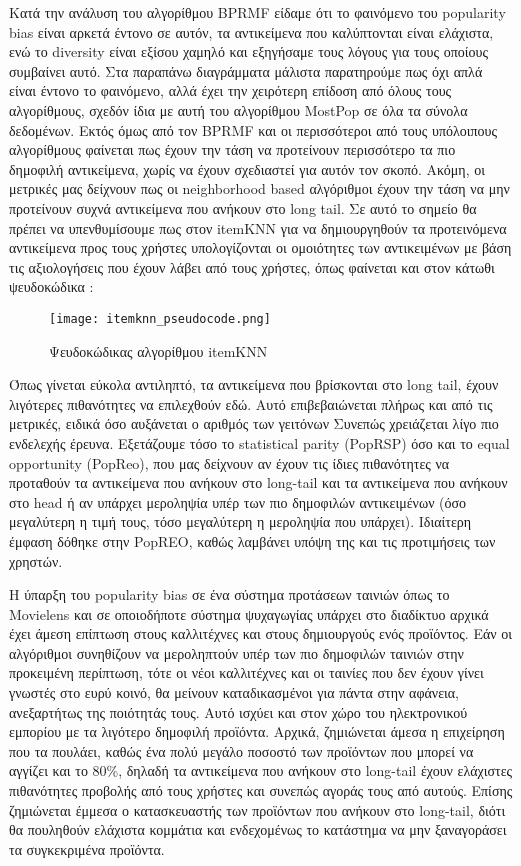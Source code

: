 \noindent Κατά την ανάλυση του αλγορίθμου BPRMF είδαμε ότι το φαινόμενο του popularity bias είναι αρκετά έντονο σε αυτόν, τα αντικείμενα που καλύπτονται είναι ελάχιστα, ενώ το diversity είναι εξίσου χαμηλό και εξηγήσαμε τους λόγους για τους οποίους συμβαίνει αυτό. Στα παραπάνω διαγράμματα μάλιστα παρατηρούμε πως όχι απλά είναι έντονο το φαινόμενο, αλλά έχει την χειρότερη επίδοση από όλους τους αλγορίθμους, σχεδόν ίδια με αυτή του αλγορίθμου MostPop σε όλα τα σύνολα δεδομένων. Εκτός όμως από τον BPRMF και οι περισσότεροι από τους υπόλοιπους αλγορίθμους φαίνεται πως έχουν την τάση να προτείνουν περισσότερο τα πιο δημοφιλή αντικείμενα, χωρίς να έχουν σχεδιαστεί για αυτόν τον σκοπό. Ακόμη, οι μετρικές μας δείχνουν πως οι neighborhood based αλγόριθμοι έχουν την τάση να μην προτείνουν συχνά αντικείμενα που ανήκουν στο long tail. Σε αυτό το σημείο θα πρέπει να υπενθυμίσουμε πως στον itemKNN για να δημιουργηθούν τα προτεινόμενα αντικείμενα προς τους χρήστες υπολογίζονται οι ομοιότητες των αντικειμένων με βάση τις αξιολογήσεις που έχουν λάβει από τους χρήστες, όπως φαίνεται και στον κάτωθι ψευδοκώδικα \cite{lindenAmazonComRecommendations2003}:
\begin{figure}[H]
	\centering
	\texttt{[image: itemknn\_pseudocode.png]}
	\caption{Ψευδοκώδικας αλγορίθμου itemKNN}
	\label{fig:item_pseudo}
\end{figure}
\noindent Όπως γίνεται εύκολα αντιληπτό, τα αντικείμενα που βρίσκονται στο long tail, έχουν λιγότερες πιθανότητες να επιλεχθούν εδώ. Αυτό επιβεβαιώνεται πλήρως και από τις μετρικές, ειδικά όσο αυξάνεται ο αριθμός των γειτόνων
Συνεπώς χρειάζεται λίγο πιο ενδελεχής έρευνα.
Εξετάζουμε τόσο το statistical parity (PopRSP) όσο και το equal opportunity (PopReo), που μας δείχνουν αν έχουν τις ίδιες πιθανότητες να προταθούν τα αντικείμενα που ανήκουν στο long-tail και τα αντικείμενα που ανήκουν στο head ή αν υπάρχει μεροληψία υπέρ των πιο δημοφιλών αντικειμένων (όσο μεγαλύτερη η τιμή τους, τόσο μεγαλύτερη η μεροληψία που υπάρχει). Ιδιαίτερη έμφαση δόθηκε στην PopREO, καθώς λαμβάνει υπόψη της και τις προτιμήσεις των χρηστών.

\noindent Η ύπαρξη του popularity bias σε ένα σύστημα προτάσεων ταινιών όπως το Movielens και σε οποιοδήποτε σύστημα ψυχαγωγίας υπάρχει στο διαδίκτυο αρχικά έχει άμεση επίπτωση στους καλλιτέχνες και στους δημιουργούς ενός προϊόντος. Εάν οι αλγόριθμοι συνηθίζουν να μεροληπτούν υπέρ των πιο δημοφιλών ταινιών στην προκειμένη περίπτωση, τότε οι νέοι καλλιτέχνες και οι ταινίες που δεν έχουν γίνει γνωστές στο ευρύ κοινό, θα μείνουν καταδικασμένοι για πάντα στην αφάνεια, ανεξαρτήτως της ποιότητάς τους. Αυτό ισχύει και στον χώρο του ηλεκτρονικού εμπορίου με τα λιγότερο δημοφιλή προϊόντα. Αρχικά, ζημιώνεται άμεσα η επιχείρηση που τα πουλάει, καθώς ένα πολύ μεγάλο ποσοστό των προϊόντων που μπορεί να αγγίζει και το 80\%, δηλαδή τα αντικείμενα που ανήκουν στο long-tail έχουν ελάχιστες πιθανότητες προβολής από τους χρήστες και συνεπώς αγοράς τους από αυτούς. Επίσης ζημιώνεται έμμεσα ο κατασκευαστής των προϊόντων που ανήκουν στο long-tail, διότι θα πουληθούν ελάχιστα κομμάτια και ενδεχομένως το κατάστημα να μην ξαναγοράσει τα συγκεκριμένα προϊόντα.\\


